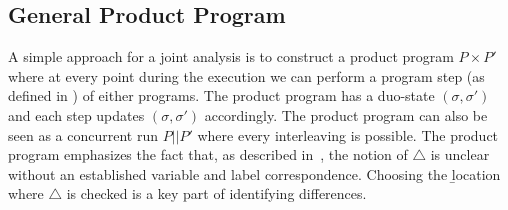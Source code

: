 \subsection{General Product Program} 
A simple approach for a joint analysis is to construct a product program $P \times P'$ where at every point during the execution we can perform a program step (as defined in ) of either programs. The product program has a duo-state $(\sigma,\sigma')$ and each step updates $(\sigma,\sigma')$ accordingly. The product program can also be seen as a concurrent run $P||P'$ where every interleaving is possible. The product program emphasizes the fact that, as described in~, the notion of $\triangle$ is unclear without an established variable and label correspondence. Choosing the \b{location} where $\triangle$ is checked is a key part of identifying differences. %




